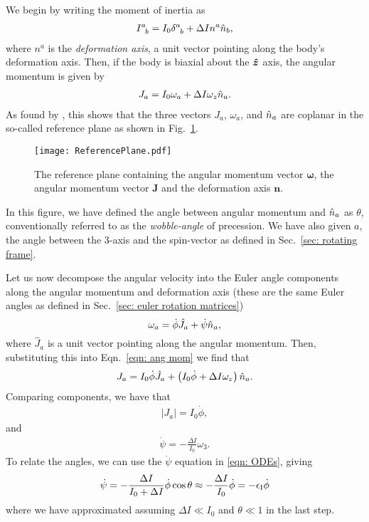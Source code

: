 \documentclass[../full_thesis/full_thesis.tex]{subfiles}
\begin{document}
We begin by writing the moment of inertia as
\begin{align}
I^{a}_{\;\;b} = I_{0} \delta^{a}_{\;\;b} + \Delta I n^a \hat{n}_b,
\end{align}
where $n^a$ is the \emph{deformation axis}, a unit vector pointing along the
body's deformation axis. Then, if the body is biaxial about the $\boldsymbol{\hat{z}}$ axis,
the angular momentum is given by
\begin{align}
J_{a} = I_0 \omega_a + \Delta I \omega_z \hat{n}_a.
\label{eqn: ang mom}
\end{align}
As found by \citet{Pines1972}, this shows that the three vectors $J_a$,
$\omega_a$, and $\hat{n}_a$ are coplanar in the so-called reference plane as shown in
Fig.~\ref{fig: reference plane}.
\begin{figure}[htb]
    \texttt{[image: ReferencePlane.pdf]}
    \caption{The reference plane containing the angular momentum vector $\mathbf{\omega}$,
    the angular momentum vector $\mathbf{J}$ and the deformation axis $\mathbf{n}$.}
    \label{fig: reference plane}
\end{figure}
In this figure, we have defined the angle between angular momentum and $\hat{n}_a$ as
$\theta$, conventionally referred to as the \emph{wobble-angle} of
precession. We have also given $a$, the angle between the 3-axis and the
spin-vector as defined in Sec.~\ref{sec: rotating frame}.

Let us now decompose the angular velocity into the Euler angle components along
the angular momentum and deformation axis (these are the same Euler angles as defined in
Sec.~\ref{sec: euler rotation matrices})
\begin{equation}
  \omega_a = \dot{\phi}\hat{J}_a + \dot{\psi}\hat{n}_{a},
\label{eqn: decomp}
\end{equation}
where $\hat{J}_a$ is a unit vector pointing along the angular momentum. Then,
substituting this into Eqn.~\eqref{eqn: ang mom} we find that
\begin{align}
J_a = I_0 \dot{\phi} \hat{J}_a + \left(I_0 \dot{\phi} + \Delta I \omega_z\right)\hat{n}_a.
\end{align}
Comparing components, we have that
\begin{align}
|J_a| = I_0 \dot{\phi},
\end{align}
and
\begin{align}
\dot{\psi} = -\frac{\Delta I}{I_0} \omega_3.
\end{align}
To relate the angles, we can use the $\dot{\psi}$ equation in \eqref{eqn: ODEs},
giving
\begin{align}
\dot{\psi} = - \frac{\Delta I}{I_0 + \Delta I} \dot{\phi} \cos\theta
\approx -\frac{\Delta I}{I_0} \dot{\phi} = -\epsilon_{\mathrm{I}} \dot{\phi}
\label{eqn: psi phi}
\end{align}
where we have approximated assuming $\Delta I \ll I_0$ and $\theta \ll 1$ in
the last step.
\end{document}
